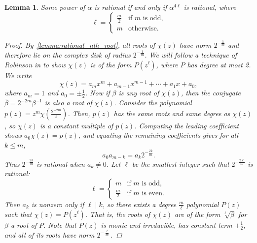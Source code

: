 \documentclass[12pt, letterpaper]{article}
\newcommand{\paren}[1]{\left(#1\right)}
\newcommand{\pfrac}[2]{\paren{\frac{#1}{#2}}}
\newtheorem{lemma}[thm]{Lemma}
\begin{document}
\begin{lemma}\label{lemma:charpoly_restriction}
    Some power of $\alpha$ is rational if and only if $\alpha^{4\ell}$ is
    rational, where
    \[
        \ell = \begin{cases}
            \frac{m}{2} & \text{if $m$ is odd,}\\
            m & \text{otherwise.}
        \end{cases}
    \]
    \begin{proof}
        By~\cref{lemma:rational_nth_root}, all roots of $\chi(z)$ have norm
        $2^{-\frac{1}{m}}$ and therefore lie on the complex disk of radius
        $2^{-\frac{1}{m}}$. We will follow a technique of Robinson in
        \cite{Robinson1969} to show $\chi(z)$ is of the form $P(z^\ell)$,
        where $P$ has degree at most 2. We write
        \[
            \chi(z) = a_m x^m + a_{m-1}x^{m-1} + \cdots + a_1 x + a_0,
        \]
        where $a_m = 1$ and $a_0 = \pm \frac{1}{2}$. Now if $\beta$ is any root
        of $\chi(z)$, then the conjugate $\overline{\beta} = 2^{-2m}
        \beta^{-1}$ is also a root of $\chi(z)$.  Consider the polynomial $p(z)
        = z^m \chi\pfrac{2^{-2m}}{z}$. Then, $p(z)$ has the same roots and same
        degree as $\chi(z)$, so $\chi(z)$ is a constant multiple of $p(z)$.
        Computing the leading coefficient shows $a_0 \chi(z) = p(z)$, and
        equating the remaining coefficients gives for all $k \le m$,
        \[
            a_0 a_{m-k} = a_k 2^{-\frac{2k}{m}}.
        \]
        Thus $2^{-\frac{2k}{m}}$ is rational when $a_k \ne 0$. Let $\ell$
        be the smallest integer such that $2^{-\frac{2\ell}{m}}$ is rational:
        \[
            \ell = \begin{cases}
                m & \text{if $m$ is odd,}\\
                \frac{m}{2} & \text{if $m$ is even.}
            \end{cases}
        \]
        Then $a_k$ is nonzero only if $\ell \mid k$, so there exists a
        degree $\frac{m}{\ell}$ polynomial $P(z)$ such that
        $\chi(z) = P\paren{z^{\ell}}$. That is, the roots of $\chi(z)$ are
        of the form $\sqrt[\ell]{\beta}$ for $\beta$ a root of $P$.
        Note that $P(z)$ is monic and irreducible, has constant term $\pm
        \frac{1}{2}$, and all of its roots have norm $2^{-\frac{\ell}{m}}$.


\end{proof}
\end{lemma}
\end{document}
